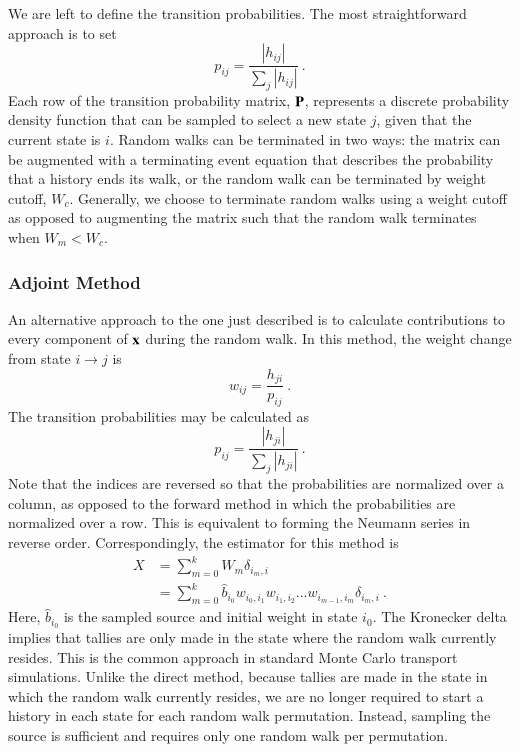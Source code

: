 \documentclass[preprint,12pt]{elsarticle}
\newcommand{\vx}{\ensuremath{\ve{x}}}
\newcommand{\vP}{\ensuremath{\ve{P}}}
\begin{document}
We are left to define the transition probabilities. The most
straightforward approach is to set
\begin{equation}
  p_{ij} = \frac{|h_{ij}|}{\sum_{j}|h_{ij}|}\:.
  \label{eq:probability}
\end{equation}
Each row of the transition probability matrix, $\vP$, represents a
discrete probability density function that can be sampled to select a
new state $j$, given that the current state is $i$.  Random walks can
be terminated in two ways: the matrix can be augmented with a
terminating event equation that describes the probability that a
history ends its walk, or the random walk can be terminated by weight
cutoff, $W_c$.  Generally, we choose to terminate random walks using a
weight cutoff as opposed to augmenting the matrix such that the random
walk terminates when $W_m < W_c$.


\subsubsection{Adjoint Method}
\label{sec:adjoint-method}

An alternative approach to the one just described is to calculate
contributions to every component of $\vx$ during the random walk. In
this method, the weight change from state $i\rightarrow j$ is
\begin{equation}
  w_{ij} = \frac{h_{ji}}{p_{ij}}\:.
  \label{eq:adjoint-weight}
\end{equation}
The transition probabilities may be calculated as
\begin{equation}
  p_{ij} = \frac{|h_{ji}|}{\sum_{j}|h_{ji}|}\:.
  \label{eq:adjoint-probability}
\end{equation}
Note that the indices are reversed so that the probabilities are
normalized over a column, as opposed to the forward method in which
the probabilities are normalized over a row.  This is equivalent to
forming the Neumann series in reverse order.  Correspondingly, the
estimator for this method is
\begin{equation}
  \begin{split}
    X &= \sum_{m=0}^{k}W_m\delta_{i_m,i}\\ &=
    \sum_{m=0}^{k}\hat{b}_{i_0}w_{i_0,i_1}w_{i_1,i_2}\ldots
    w_{i_{m-1},i_m}\delta_{i_m,i}\:.
  \end{split}
  \label{eq:adjoint-tally}
\end{equation}
Here, $\hat{b}_{i_0}$ is the sampled source and initial weight in
state $i_0$.  The Kronecker delta implies that tallies are only made
in the state where the random walk currently resides.  This is the
common approach in standard Monte Carlo transport simulations. Unlike
the direct method, because tallies are made in the state in which the
random walk currently resides, we are no longer required to start a
history in each state for each random walk permutation. Instead,
sampling the source is sufficient and requires only one random walk
per permutation.
\end{document}
